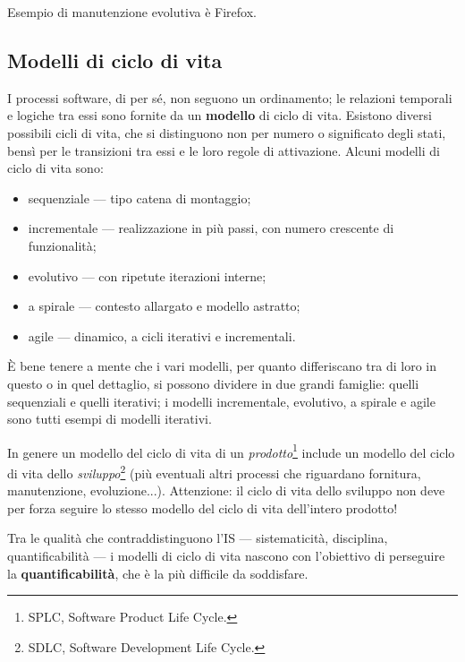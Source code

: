 \documentclass[a4paper]{article}
\begin{document}
		
Esempio di manutenzione evolutiva è Firefox.

		
	\subsection{Modelli di ciclo di vita}

		
I processi software, di per sé, non seguono un ordinamento; le relazioni temporali e logiche tra essi sono fornite da un \textbf{modello} di ciclo di vita. Esistono diversi possibili cicli di vita, che si distinguono non per numero o significato degli stati, bensì per le transizioni tra essi e le loro regole di attivazione. Alcuni modelli di ciclo di vita sono:
		
	\begin{itemize}
		
			
	\item sequenziale --- tipo catena di montaggio;
			
	\item incrementale --- realizzazione in più passi, con numero crescente di funzionalità;
			
	\item evolutivo --- con ripetute iterazioni interne;
			
	\item a spirale --- contesto allargato e modello astratto;
			
	\item agile --- dinamico, a cicli iterativi e incrementali.
		
	\end{itemize}

		
È bene tenere a mente che i vari modelli, per quanto differiscano tra di loro in questo o in quel dettaglio, si possono dividere in due grandi famiglie: quelli sequenziali e quelli iterativi; i modelli incrementale, evolutivo, a spirale e agile sono tutti esempi di modelli iterativi.
		
In genere un modello del ciclo di vita di un \emph{prodotto}\footnote{SPLC, Software Product Life Cycle.} include un modello del ciclo di vita dello \emph{sviluppo}\footnote{SDLC, Software Development Life Cycle.} (più eventuali altri processi che riguardano fornitura, manutenzione, evoluzione...). Attenzione: il ciclo di vita dello sviluppo non deve per forza seguire lo stesso modello del ciclo di vita dell'intero prodotto!
		
Tra le qualità che contraddistinguono l'IS --- sistematicità, disciplina, quantificabilità --- i modelli di ciclo di vita nascono con l'obiettivo di perseguire la \textbf{quantificabilità}, che è la più difficile da soddisfare.
\end{document}
